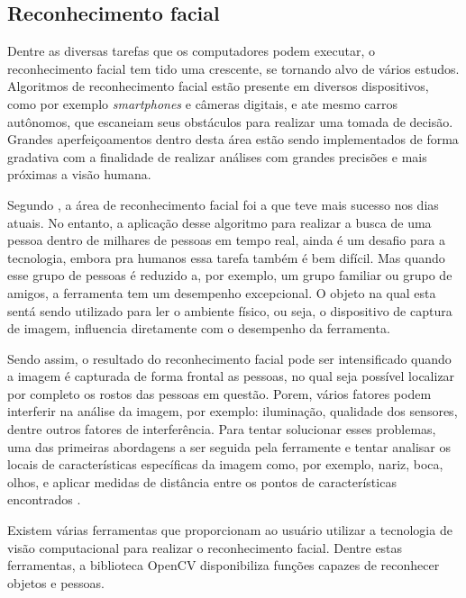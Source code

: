 \subsection{\textbf{Reconhecimento facial}}

Dentre as diversas tarefas que os computadores podem executar, o reconhecimento facial tem tido uma crescente, se tornando alvo de vários estudos. Algoritmos de reconhecimento facial estão presente em diversos dispositivos, como por exemplo \textit{smartphones} e câmeras digitais, e ate mesmo carros autônomos, que escaneiam seus obstáculos para realizar uma tomada de decisão. Grandes aperfeiçoamentos dentro desta área estão sendo implementados de forma gradativa com a finalidade de realizar análises com grandes precisões e mais próximas a visão humana.

Segundo , a área de reconhecimento facial foi a que teve mais sucesso nos dias atuais. No entanto, a aplicação desse algoritmo para realizar a busca de uma pessoa dentro de milhares de pessoas em tempo real, ainda é um desafio para a tecnologia, embora pra humanos essa tarefa também é bem difícil. Mas quando esse grupo de pessoas é reduzido a, por exemplo, um grupo familiar ou grupo de amigos, a ferramenta tem um desempenho excepcional. O objeto na qual esta sentá sendo utilizado para ler o ambiente físico, ou seja, o dispositivo de captura de imagem, influencia diretamente com o desempenho da ferramenta.

Sendo assim, o resultado do reconhecimento facial pode ser intensificado quando a imagem é capturada de forma frontal as pessoas, no qual seja possível localizar por completo os rostos das pessoas em questão. Porem, vários fatores podem interferir na análise da imagem, por exemplo: iluminação, qualidade dos sensores, dentre outros fatores de interferência. Para tentar solucionar esses problemas, uma das primeiras abordagens a ser seguida pela ferramente e tentar analisar os locais de características específicas da imagem como, por exemplo, nariz, boca, olhos, e aplicar medidas de distância entre os pontos de características encontrados \cite{SZELISKI2010}.

Existem várias ferramentas que proporcionam ao usuário utilizar a tecnologia de visão computacional para realizar o reconhecimento facial. Dentre estas ferramentas, a biblioteca OpenCV disponibiliza funções capazes de reconhecer objetos e pessoas. 